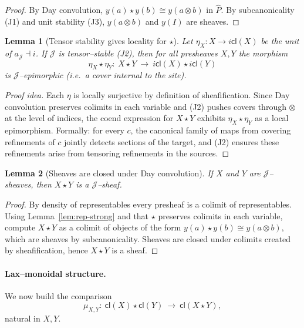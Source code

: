 \documentclass[11pt]{article}
\numberwithin{equation}{section}
\theoremstyle{upright}
\newtheorem{lemma}{Lemma}
\begin{document}
\begin{proof}
By Day convolution, $y(a)\star y(b)\cong y(a\otimes b)$ in $\widehat P$.
By subcanonicality (J1) and unit stability (J3), $y(a\otimes b)$ and $y(I)$ are sheaves.
\end{proof}

\begin{lemma}[Tensor stability gives locality for $\star$]\label{lem:local-epi}
Let $\eta_X:X\to i\mathsf{cl}(X)$ be the unit of $a_{\mathcal J}\dashv i$.
If $\mathcal J$ is tensor--stable \emph{(J2)}, then for all presheaves $X,Y$
the morphism
\[
\eta_X\star \eta_Y:\ X\star Y\ \longrightarrow\ i\mathsf{cl}(X)\star i\mathsf{cl}(Y)
\]
is \emph{$\mathcal J$--epimorphic} (i.e.\ a cover internal to the site).
\end{lemma}

\begin{proof}[Proof idea]
Each $\eta$ is locally surjective by definition of sheafification.
Since Day convolution preserves colimits in each variable and (J2) pushes covers
through $\otimes$ at the level of indices, the coend expression for $X\star Y$
exhibits $\eta_X\star\eta_Y$ as a local epimorphism. Formally: for every $c$,
the canonical family of maps from covering refinements of $c$ jointly detects
sections of the target, and (J2) ensures these refinements arise from tensoring
refinements in the sources.
\end{proof}

\begin{lemma}[Sheaves are closed under Day convolution]\label{lem:sheaf-closed}
If $X$ and $Y$ are $\mathcal J$--sheaves, then $X\star Y$ is a $\mathcal J$--sheaf.
\end{lemma}

\begin{proof}
By density of representables every presheaf is a colimit of representables.
Using Lemma~\ref{lem:rep-strong} and that $\star$ preserves colimits in each variable,
compute $X\star Y$ as a colimit of objects of the form $y(a)\star y(b)\cong y(a\otimes b)$,
which are sheaves by subcanonicality. Sheaves are closed under colimits created by
sheafification, hence $X\star Y$ is a sheaf.
\end{proof}

\paragraph{Lax--monoidal structure.}
We now build the comparison
\[
\mu_{X,Y}:\ \mathsf{cl}(X)\star \mathsf{cl}(Y)\ \longrightarrow\ \mathsf{cl}(X\star Y),
\]
natural in $X,Y$.
\end{document}
